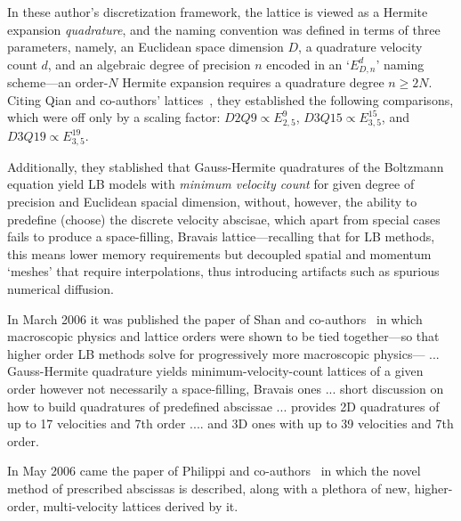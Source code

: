     In these author's discretization framework, the lattice is viewed as a Hermite expansion \emph{quadrature}, and  the  naming
    convention was defined in terms of three parameters, namely, an Euclidean space dimension $D$, a quadrature  velocity  count
    $d$, and an algebraic degree of precision $n$ encoded in an `$E_{D,n}^{d}$' naming scheme---an order-$N$  Hermite  expansion
    requires      a      quadrature      degree      $n      \geqslant      2N$.      Citing      Qian      and      co-authors'
    lattices~\cite{1992-QianYH+LallemandP-EurophysLett}, they established the following comparisons, which were off  only  by  a
    scaling factor: $D2Q9 \propto E_{2,5}^{9}$, $D3Q15 \propto E_{3,5}^{15}$, and $D3Q19 \propto E_{3,5}^{19}$.

    Additionally, they stablished that Gauss-Hermite quadratures of the Boltzmann equation yield LB  models  with  \emph{minimum
    velocity count} for given degree of precision and Euclidean spacial dimension, without, however, the  ability  to  predefine
    (choose) the discrete velocity abscisae,  which  apart  from  special  cases  fails  to  produce  a  space-filling,  Bravais
    lattice---recalling that for LB methods, this means lower memory requirements but decoupled spatial  and  momentum  `meshes'
    that require interpolations, thus introducing artifacts such as spurious numerical diffusion.

    

    In March 2006 it was published the paper of Shan and co-authors~\cite{2006-ShanX+ChenH-JFluidMech} in which macroscopic
    physics and lattice orders were shown to be tied together---so that higher order LB methods solve for progressively more
    macroscopic physics--- ... Gauss-Hermite quadrature yields minimum-velocity-count lattices of a given order however not
    necessarily a space-filling, Bravais ones ... short discussion on how to build quadratures of predefined abscissae ...
    provides 2D quadratures of up to 17 velocities and 7th order .... and 3D ones with up to 39 velocities and 7th order.

    In May 2006 came the paper of Philippi and co-authors~\cite{2006-PhilippiPC+SurmasR-PhysRevE} in which the novel method of
    prescribed abscissas is described, along with a plethora of new, higher-order, multi-velocity lattices derived by it.





